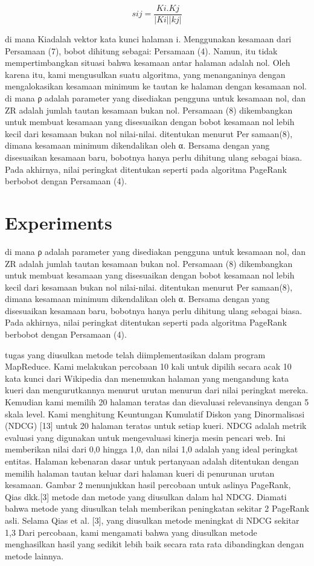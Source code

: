 \documentclass[conference]{IEEEtran}
\begin{document}
\begin{equation}
    sij = \frac{Ki.Kj}{|Ki||kj|} 
\end{equation}

di mana Kiadalah vektor kata kunci halaman i.
Menggunakan kesamaan dari Persamaan (7), bobot dihitung
sebagai: Persamaan (4). Namun, itu tidak mempertimbangkan
situasi bahwa kesamaan antar halaman adalah nol. Oleh karena
itu, kami mengusulkan suatu algoritma, yang menanganinya
dengan mengalokasikan kesamaan minimum ke tautan ke
halaman dengan kesamaan nol.
di mana ρ adalah parameter yang disediakan pengguna untuk
kesamaan nol, dan ZR adalah jumlah tautan kesamaan bukan
nol.
Persamaan (8) dikembangkan untuk membuat kesamaan
yang disesuaikan dengan bobot kesamaan nol lebih kecil
dari kesamaan bukan nol nilai-nilai. ditentukan menurut Persamaan(8), dimana kesamaan minimum dikendalikan oleh α.
Bersama dengan yang disesuaikan kesamaan baru, bobotnya
hanya perlu dihitung ulang sebagai biasa. Pada akhirnya,
nilai peringkat ditentukan seperti pada algoritma PageRank
berbobot dengan Persamaan (4).



\section{Experiments}
di mana ρ adalah parameter yang disediakan pengguna untuk
kesamaan nol, dan ZR adalah jumlah tautan kesamaan bukan
nol.
Persamaan (8) dikembangkan untuk membuat kesamaan
yang disesuaikan dengan bobot kesamaan nol lebih kecil
dari kesamaan bukan nol nilai-nilai. ditentukan menurut Persamaan(8), dimana kesamaan minimum dikendalikan oleh α.
Bersama dengan yang disesuaikan kesamaan baru, bobotnya
hanya perlu dihitung ulang sebagai biasa. Pada akhirnya,
nilai peringkat ditentukan seperti pada algoritma PageRank
berbobot dengan Persamaan (4).

tugas yang diusulkan metode telah diimplementasikan dalam
program MapReduce. Kami melakukan percobaan 10 kali
untuk dipilih secara acak 10 kata kunci dari Wikipedia
dan menemukan halaman yang mengandung kata kueri
dan mengurutkannya menurut urutan menurun dari nilai
peringkat mereka. Kemudian kami memilih 20 halaman
teratas dan dievaluasi relevansinya dengan 5 skala level.
Kami menghitung Keuntungan Kumulatif Diskon yang
Dinormalisasi (NDCG) [13] untuk 20 halaman teratas
untuk setiap kueri. NDCG adalah metrik evaluasi yang
digunakan untuk mengevaluasi kinerja mesin pencari web. Ini
memberikan nilai dari 0,0 hingga 1,0, dan nilai 1,0 adalah
yang ideal peringkat entitas. Halaman kebenaran dasar untuk
pertanyaan adalah ditentukan dengan memilih halaman tautan
keluar dari halaman kueri di penurunan urutan kesamaan.
Gambar 2 menunjukkan hasil percobaan untuk aslinya
PageRank, Qias dkk.[3] metode dan metode yang diusulkan
dalam hal NDCG. Diamati bahwa metode yang diusulkan
telah memberikan peningkatan sekitar 2%
PageRank asli. Selama Qias et al. [3], yang diusulkan metode
meningkat di NDCG sekitar 1,3%
Dari percobaan, kami mengamati bahwa yang diusulkan
metode menghasilkan hasil yang sedikit lebih baik secara ratarata dibandingkan dengan metode lainnya.
\end{document}
